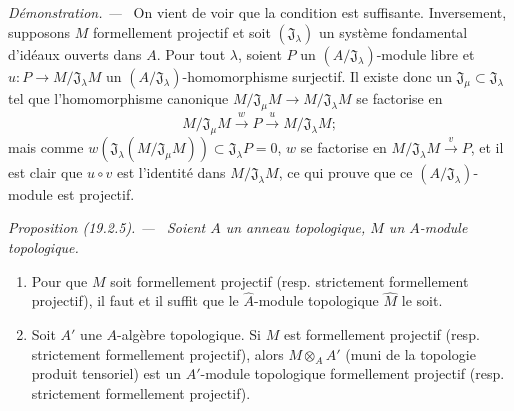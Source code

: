 \documentclass[10pt,oneside]{book}
\makeatletter
\newcommand{\setmanualcurrentlabel}[1]{\def\@currentlabel{#1}}
\newenvironment{proposition}[1][]{%
  \setmanualcurrentlabel{#1}\par\medskip\noindent\itshape Proposition (#1). ---\ }{\par}
\newenvironment{proof}{%
  \par\medskip\noindent\textit{Démonstration. ---\ }}{\par}
\makeatother
\begin{document}
\begin{proof}
On vient de voir que la condition est suffisante. Inversement, supposons $M$
formellement projectif et soit $(\mathfrak J_\lambda)$ un système fondamental
d'idéaux ouverts dans $A$. Pour tout $\lambda$, soient $P$ un
$(A/\mathfrak J_\lambda)$-module libre et
$u:P\to M/\mathfrak J_\lambda M$ un
$(A/\mathfrak J_\lambda)$-homomorphisme surjectif. Il existe donc un
$\mathfrak J_\mu\subset\mathfrak J_\lambda$ tel que l'homomorphisme canonique
$M/\mathfrak J_\mu M\to M/\mathfrak J_\lambda M$ se factorise en
\[
  M/\mathfrak J_\mu M\xrightarrow{w}P\xrightarrow{u}M/\mathfrak J_\lambda M;
\]
mais comme
$w(\mathfrak J_\lambda(M/\mathfrak J_\mu M))\subset\mathfrak J_\lambda P=0$,
$w$ se factorise en $M/\mathfrak J_\lambda M\xrightarrow{v}P$, et il est
clair que $u\circ v$ est l'identité dans $M/\mathfrak J_\lambda M$, ce qui
prouve que ce $(A/\mathfrak J_\lambda)$-module est projectif.
\end{proof}

\begin{proposition}[19.2.5]
\label{0.19.2.5-fr}
Soient $A$ un anneau topologique, $M$ un $A$-module topologique.
\begin{enumerate}
  \item[(i)] Pour que $M$ soit formellement projectif (resp. strictement
  formellement projectif), il faut et il suffit que le $\hat A$-module
  topologique $\hat M$ le soit.
  \item[(ii)] Soit $A'$ une $A$-algèbre topologique. Si $M$ est formellement
  projectif (resp. strictement formellement projectif), alors
  $M\otimes_A A'$ (muni de la topologie produit tensoriel) est un $A'$-module
  topologique formellement projectif (resp. strictement formellement
  projectif).
\end{enumerate}
\end{proposition}
\end{document}
